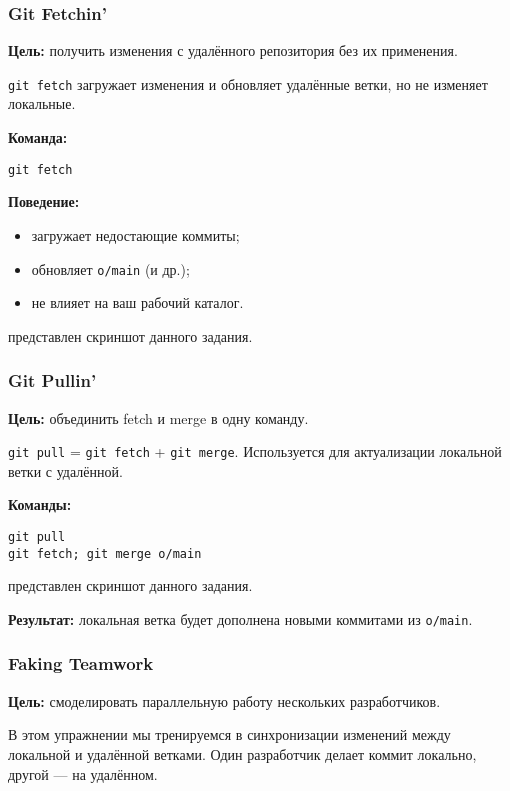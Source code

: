 \documentclass[a4paper,12pt]{report}
\begin{document}
\subsubsection{Git Fetchin'}
\textbf{Цель:} получить изменения с удалённого репозитория без их применения.

\texttt{git fetch} загружает изменения и обновляет удалённые ветки, но не изменяет локальные.

\textbf{Команда:}
\begin{verbatim}
git fetch
\end{verbatim}

\textbf{Поведение:}
\begin{itemize}[noitemsep]
    \item загружает недостающие коммиты;
    \item обновляет \texttt{o/main} (и др.);
    \item не влияет на ваш рабочий каталог.
\end{itemize}

 представлен скриншот данного задания.

\subsubsection{Git Pullin'}
\textbf{Цель:} объединить fetch и merge в одну команду.

\texttt{git pull} = \texttt{git fetch} + \texttt{git merge}. Используется для актуализации локальной ветки с удалённой.

\textbf{Команды:}
\begin{verbatim}
git pull
git fetch; git merge o/main
\end{verbatim}

 представлен скриншот данного задания.

\textbf{Результат:} локальная ветка будет дополнена новыми коммитами из \texttt{o/main}.

\subsubsection{Faking Teamwork}
\textbf{Цель:} смоделировать параллельную работу нескольких разработчиков.

В этом упражнении мы тренируемся в синхронизации изменений между локальной и удалённой ветками. Один разработчик делает коммит локально, другой — на удалённом.
\end{document}

